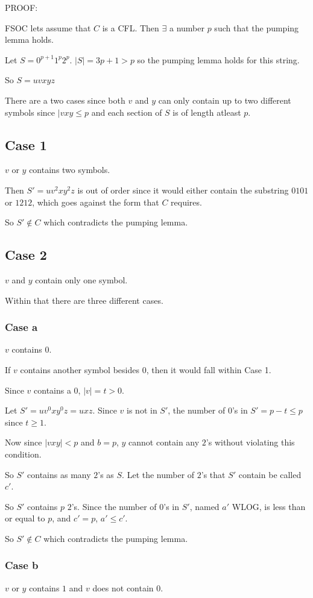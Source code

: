 \documentclass[letterpaper, 11pt]{article}
\begin{document}
PROOF:

FSOC lets assume that $C$ is a CFL.
Then $\exists$ a number $p$ such that the pumping lemma holds.

Let $S = 0^{p+1}1^p2^p$.
$|S| = 3p+1 > p$ so the pumping lemma holds for this string.

So $S = uvxyz$

There are a two cases since both $v$ and $y$ can only contain up to two different symbols since $|vxy \leq p$ and each section of $S$ is of length atleast $p$.

\subsection*{Case 1}
$v$ or $y$ contains two symbols.

Then $S' = uv^2xy^2z$ is out of order since it would either contain the substring $0101$ or $1212$, which goes against the form that $C$ requires.

So $S' \notin C$ which contradicts the pumping lemma.

\subsection*{Case 2}
$v$ and $y$ contain only one symbol.

Within that there are three different cases.
\subsubsection*{Case a}
$v$ contains $0$.

If $v$ contains another symbol besides $0$, then it would fall within Case 1.

Since $v$ contains a $0$, $|v| = t > 0$.

Let $S' = uv^0xy^0z = uxz$.
Since $v$ is not in $S'$, the number of $0$'s in $S' = p-t \leq p$ since $t \geq 1$.

Now since $|vxy| < p$ and $b = p$, $y$ cannot contain any $2$'s without violating this condition.

So $S'$ contains as many $2$'s as $S$.
Let the number of $2$'s that $S'$ contain be called $c'$.

So $S'$ contains $p$ $2$'s.
Since the number of $0$'s in $S'$, named $a'$ WLOG, is less than or equal to $p$, and $c' = p$,
$a' \leq c'$.

So $S' \notin C$ which contradicts the pumping lemma.

\subsubsection*{Case b}
$v$ or $y$ contains $1$ and $v$ does not contain $0$.
\end{document}
